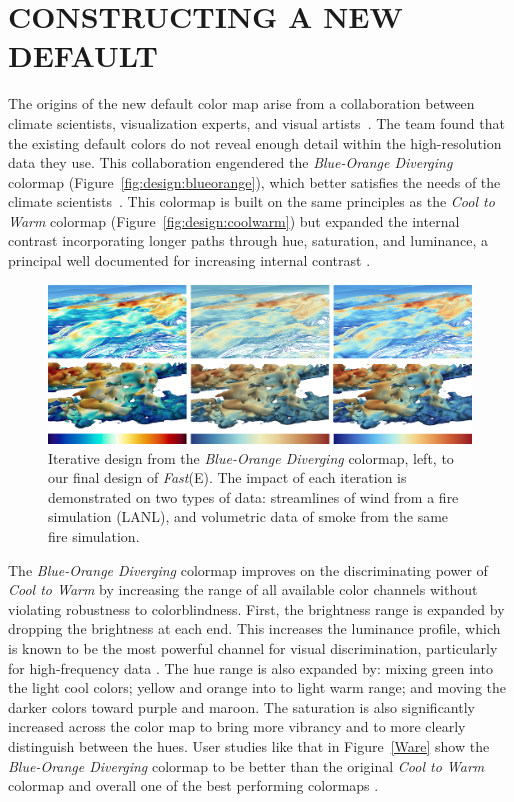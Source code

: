 \documentclass{IEEEcsmag}
\newcommand*{\colormap}[1]{\textsl{#1}\xspace}
\newcommand*{\coolwarm}{\colormap{Cool to Warm}}
\newcommand*{\blueorange}{\colormap{Blue-Orange Diverging}}
\newcommand*{\fast}{\colormap{Fast}}
\begin{document}
\section{CONSTRUCTING A NEW DEFAULT}
The origins of the new default color map arise from a collaboration between climate scientists, visualization experts, and visual artists~\cite{Samsel2015}.
The team found that the existing default colors do not reveal enough detail within the high-resolution data they use.
This collaboration engendered the \blueorange colormap (Figure~\ref{fig:design:blueorange}), which better satisfies the needs of the climate scientists~\cite{Samsel2015:SC}.
This colormap is built on the same principles as the \coolwarm colormap (Figure~\ref{fig:design:coolwarm}) but expanded the internal contrast incorporating longer paths through hue, saturation, and luminance, a principal well documented for increasing internal contrast \cite{Ware2023}.  


\begin{figure}[t]
  \centering
  \includegraphics[width=\textwidth]{Final_Pics/Compare22.png}
  \caption{
    Iterative design from the \blueorange colormap, left, to our final design of \fast (E).
    The impact of each iteration is demonstrated on two types of data: streamlines of wind from a fire simulation (LANL), and volumetric data of smoke from the same fire simulation.}
\label{fig:iterations}
\end{figure}


The \blueorange colormap improves on the discriminating power of \coolwarm by increasing the range of all available color channels without violating robustness to colorblindness.
First, the brightness range is expanded by dropping the brightness at each end.
This increases the luminance profile, which is known to be the most powerful channel for visual discrimination, particularly for high-frequency data \cite{Ware2019}.
The hue range is also expanded by: mixing green into the light cool colors; yellow and orange into to light warm range; and moving the darker colors toward purple and maroon.
The saturation is also significantly increased across the color map to bring more vibrancy and to more clearly distinguish between the hues.
User studies like that in Figure~\ref{Ware}
show the \blueorange colormap to be better than the original \coolwarm colormap and overall one of the best performing colormaps \cite{Ware2017,Ware2019,Turton2017}.
\end{document}
